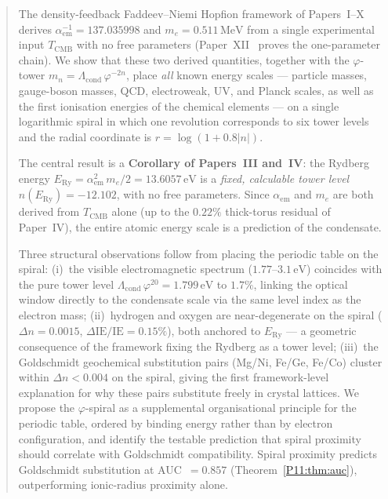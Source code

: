 \documentclass[11pt,a4paper]{article}
\theoremstyle{definition}
\theoremstyle{remark}
\newcommand{\vp}{\varphi}
\newcommand{\TCMB}{T_{\mathrm{CMB}}}
\newcommand{\Lcond}{\Lambda_{\mathrm{cond}}}
\newcommand{\ERy}{E_{\mathrm{Ry}}}
\newcommand{\aem}{\alpha_{\mathrm{em}}}
\newcommand{\IE}{\mathrm{IE}}
\begin{document}
\begin{abstract}
The density-feedback Faddeev--Niemi Hopfion framework
of Papers~I--X~\cite{Paper1,Paper2,Paper3,Paper4,Paper5,Paper6,Paper7,Paper8,Paper9,Paper10}
derives $\alpha_\mathrm{em}^{-1}=137.035998$ and $m_e=0.511\,\mathrm{MeV}$
from a single experimental input $\TCMB$ with no free parameters
(Paper~XII~\cite{Paper12} proves the one-parameter chain).
We show that these two derived quantities, together with the
$\vp$-tower $m_n = \Lcond\,\vp^{-2n}$, place \emph{all} known energy
scales --- particle masses, gauge-boson masses, QCD, electroweak,
UV, and Planck scales, as well as the first ionisation energies of
the chemical elements --- on a single logarithmic spiral in which
one revolution corresponds to six tower levels and the radial
coordinate is $r = \log(1 + 0.8|n|)$.

The central result is a \textbf{Corollary of Papers~III and~IV}:
the Rydberg energy $\ERy = \aem^2\,m_e/2 = 13.6057\,\mathrm{eV}$
is a \emph{fixed, calculable tower level}
$n(\ERy) = -12.102$, with no free parameters.
Since $\aem$ and $m_e$ are both derived from $\TCMB$ alone
(up to the $0.22\%$ thick-torus residual of Paper~IV),
the entire atomic energy scale is a prediction of the condensate.

Three structural observations follow from placing the
periodic table on the spiral:
(i)~the visible electromagnetic spectrum ($1.77$--$3.1\,\mathrm{eV}$)
coincides with the pure tower level
$\Lcond\,\vp^{20} = 1.799\,\mathrm{eV}$
to $1.7\%$, linking the optical window directly to the condensate
scale via the same level index as the electron mass;
(ii)~hydrogen and oxygen are near-degenerate on the spiral
($\Delta n = 0.0015$, $\Delta\IE/\IE = 0.15\%$), both anchored to
$\ERy$ --- a geometric consequence of the framework fixing the
Rydberg as a tower level;
(iii)~the Goldschmidt geochemical substitution pairs
(Mg/Ni, Fe/Ge, Fe/Co) cluster within $\Delta n < 0.004$
on the spiral, giving the first framework-level explanation for why
these pairs substitute freely in crystal lattices.
We propose the $\vp$-spiral as a supplemental organisational
principle for the periodic table, ordered by binding energy rather
than by electron configuration, and identify the testable prediction
that spiral proximity should correlate with Goldschmidt compatibility.
Spiral proximity predicts Goldschmidt substitution at AUC~$=0.857$
(Theorem~\ref{P11:thm:auc}), outperforming ionic-radius proximity alone.


\end{abstract}
\end{document}
